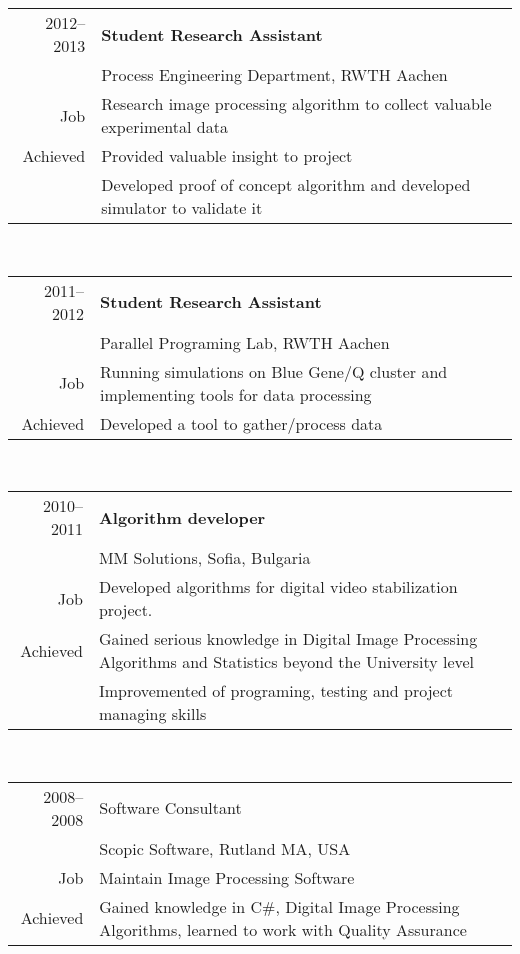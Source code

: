 \begin{tabular}{ r p{} }
2012--2013 & \textbf{Student Research Assistant} \\
           & Process Engineering Department, RWTH Aachen\\
Job        & Research image processing algorithm to collect valuable experimental data\\ 
Achieved   & Provided valuable insight to project\\
           & Developed proof of concept algorithm and developed simulator to validate it\\
\end{tabular}\\
\begin{tabular}{ r p{} }
2011--2012 & \textbf{Student Research Assistant} \\
           & Parallel Programing Lab, RWTH Aachen\\
       Job & Running simulations on Blue Gene/Q cluster and implementing tools for data processing\\
Achieved   & Developed a tool to gather/process data \\
\end{tabular}\\
\begin{tabular}{ r p{} }
2010--2011  & \textbf{Algorithm developer}\\
            & MM Solutions, Sofia, Bulgaria\\
        Job & Developed algorithms for digital video stabilization project.\\
 Achieved   &  Gained serious knowledge in Digital Image Processing Algorithms and Statistics beyond the University level\\
            & Improvemented of programing, testing and project managing skills\\
\end{tabular}\\
\begin{tabular}{ r p{} }
2008--2008  & Software Consultant \\
            & Scopic Software, Rutland MA, USA\\
Job         & Maintain Image Processing Software\\
Achieved    & Gained knowledge in C\#, Digital Image Processing Algorithms, learned to work with Quality Assurance \\
\end{tabular}\\

